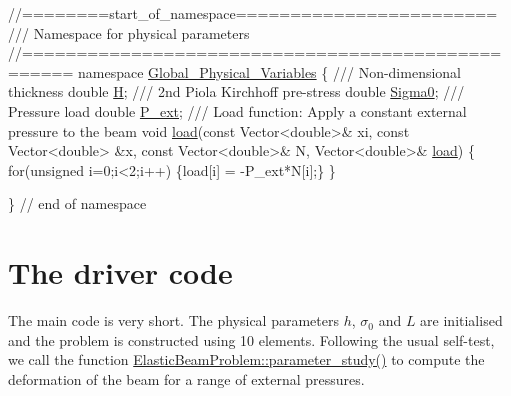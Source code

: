  
\begin{DoxyCodeInclude}
\textcolor{comment}{//========start\_of\_namespace========================}
\textcolor{comment}{/// Namespace for physical parameters}
\textcolor{comment}{}\textcolor{comment}{//==================================================}
\textcolor{keyword}{namespace }\hyperlink{namespaceGlobal__Physical__Variables}{Global\_Physical\_Variables}
\{\textcolor{comment}{}
\textcolor{comment}{ /// Non-dimensional thickness}
\textcolor{comment}{} \textcolor{keywordtype}{double} \hyperlink{namespaceGlobal__Physical__Variables_af6e07423e22c0991084d9a2f43727805}{H};
\textcolor{comment}{}
\textcolor{comment}{ /// 2nd Piola Kirchhoff pre-stress}
\textcolor{comment}{} \textcolor{keywordtype}{double} \hyperlink{namespaceGlobal__Physical__Variables_a417dc688a70c4f06ef0faed047068ba2}{Sigma0};
\textcolor{comment}{}
\textcolor{comment}{ /// Pressure load}
\textcolor{comment}{} \textcolor{keywordtype}{double} \hyperlink{namespaceGlobal__Physical__Variables_a0406c0cbd463d1df2458fe5de98a00eb}{P\_ext};
\textcolor{comment}{}
\textcolor{comment}{ /// Load function: Apply a constant external pressure to the beam}
\textcolor{comment}{} \textcolor{keywordtype}{void} \hyperlink{namespaceGlobal__Physical__Variables_a321267e1efb30b5d586302509354fb07}{load}(\textcolor{keyword}{const} Vector<double>& xi, \textcolor{keyword}{const} Vector<double> &x,
           \textcolor{keyword}{const} Vector<double>& N, Vector<double>& \hyperlink{namespaceGlobal__Physical__Variables_a321267e1efb30b5d586302509354fb07}{load})
 \{
  \textcolor{keywordflow}{for}(\textcolor{keywordtype}{unsigned} i=0;i<2;i++) \{load[i] = -P\_ext*N[i];\}
 \}

\} \textcolor{comment}{// end of namespace}

\end{DoxyCodeInclude}




 

\hypertarget{index_main}{}\section{The driver code}\label{index_main}
The main code is very short. The physical parameters $ h $, $ \sigma_{0} $ and $ L $ are initialised and the problem is constructed using 10 elements. Following the usual self-\/test, we call the function \hyperlink{classElasticBeamProblem_a2da3cb02ce953da67fb27742e20774a5}{Elastic\+Beam\+Problem\+::parameter\+\_\+study()} to compute the deformation of the beam for a range of external pressures.

